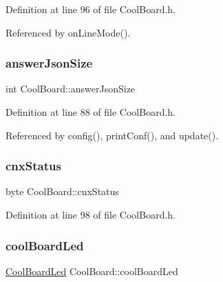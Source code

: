 Definition at line 96 of file Cool\+Board.\+h.



Referenced by on\+Line\+Mode().

\mbox{\label{classCoolBoard_af2da1f85315b3d074a8b87d158094fb7}} 
\subsubsection{\texorpdfstring{answer\+Json\+Size}{answerJsonSize}}
{\footnotesize\ttfamily int Cool\+Board\+::answer\+Json\+Size\hspace{0.3cm}{\ttfamily [private]}}



Definition at line 88 of file Cool\+Board.\+h.



Referenced by config(), print\+Conf(), and update().

\mbox{\label{classCoolBoard_abe31430e52476aff208dccf19a59c9b4}} 
\subsubsection{\texorpdfstring{cnx\+Status}{cnxStatus}}
{\footnotesize\ttfamily byte Cool\+Board\+::cnx\+Status\hspace{0.3cm}{\ttfamily [private]}}



Definition at line 98 of file Cool\+Board.\+h.

\mbox{\label{classCoolBoard_a1b1d3c684a5baa56b08486e192fd8e97}} 
\subsubsection{\texorpdfstring{cool\+Board\+Led}{coolBoardLed}}
{\footnotesize\ttfamily \hyperlink{classCoolBoardLed}{Cool\+Board\+Led} Cool\+Board\+::cool\+Board\+Led\hspace{0.3cm}{\ttfamily [private]}}



